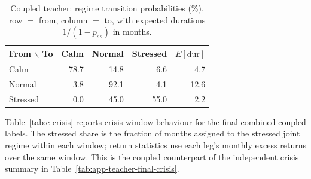 \begin{table}[H]
\centering
\caption{Coupled teacher: regime transition probabilities (\%), row $=$ from, column $=$ to,
with expected durations $1/(1-p_{ss})$ in months.}
\label{tab:c-trans}
\small
\begin{tabular}{lrrrr}
\toprule
From $\backslash$ To & Calm & Normal & Stressed & $E[\text{dur}]$ \\
\midrule
Calm     & 78.7 & 14.8 & \phantom{0}6.6 & \phantom{0}4.7 \\
Normal   & \phantom{0}3.8 & 92.1 & \phantom{0}4.1 & 12.6 \\
Stressed & \phantom{0}0.0 & 45.0 & 55.0 & \phantom{0}2.2 \\
\bottomrule
\end{tabular}
\end{table}

Table~\ref{tab:c-crisis} reports crisis-window behaviour for the final combined coupled
labels. The stressed share is the fraction of months assigned to the stressed joint regime
within each window; return statistics use each leg's monthly excess returns over the same
window. This is the coupled counterpart of the independent crisis summary in
Table~\ref{tab:app-teacher-final-crisis}.

